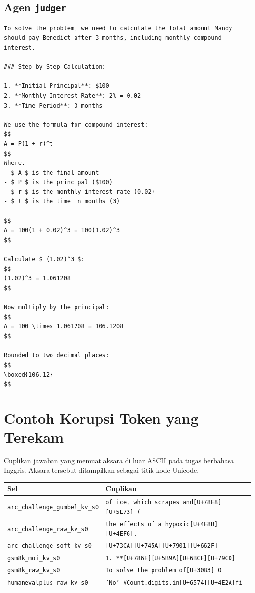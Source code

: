 \subsection*{Agen \texttt{judger}}
\begin{lstlisting}[basicstyle=\ttfamily\scriptsize,breaklines=true,frame=single]
To solve the problem, we need to calculate the total amount Mandy should pay Benedict after 3 months, including monthly compound interest.

### Step-by-Step Calculation:

1. **Initial Principal**: $100  
2. **Monthly Interest Rate**: 2% = 0.02  
3. **Time Period**: 3 months  

We use the formula for compound interest:  
$$
A = P(1 + r)^t
$$  
Where:  
- $ A $ is the final amount  
- $ P $ is the principal ($100)  
- $ r $ is the monthly interest rate (0.02)  
- $ t $ is the time in months (3)

$$
A = 100(1 + 0.02)^3 = 100(1.02)^3
$$

Calculate $ (1.02)^3 $:  
$$
(1.02)^3 = 1.061208
$$

Now multiply by the principal:  
$$
A = 100 \times 1.061208 = 106.1208
$$

Rounded to two decimal places:  
$$
\boxed{106.12}
$$
\end{lstlisting}

\section*{Contoh Korupsi Token yang Terekam}

Cuplikan jawaban yang memuat aksara di luar ASCII pada tugas berbahasa Inggris. Aksara tersebut ditampilkan sebagai titik kode Unicode.

\begin{longtable}{lp{8cm}}
\hline
Sel & Cuplikan \\
\hline\endhead
\texttt{arc\_challenge\_gumbel\_kv\_s0} & \texttt{of ice, which scrapes and[U+78E8][U+5E73] (} \\
\texttt{arc\_challenge\_raw\_kv\_s0} & \texttt{the effects of a hypoxic[U+4E8B][U+4EF6].} \\
\texttt{arc\_challenge\_soft\_kv\_s0} & \texttt{[U+73CA][U+745A][U+7901][U+662F]} \\
\texttt{gsm8k\_moi\_kv\_s0} & \texttt{1. **[U+786E][U+5B9A][U+6BCF][U+79CD]} \\
\texttt{gsm8k\_raw\_kv\_s0} & \texttt{To solve the problem of[U+30B3]  O} \\
\texttt{humanevalplus\_raw\_kv\_s0} & \texttt{'No'     \#Count.digits.in[U+6574][U+4E2A]fi} \\
\hline
\end{longtable}
